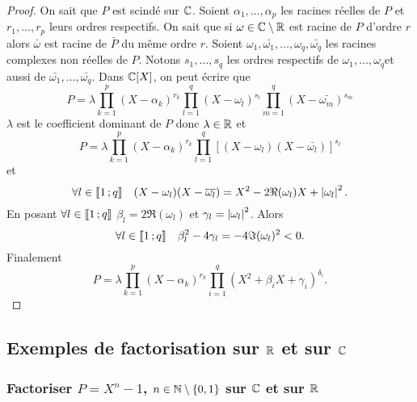   \begin{proof}
    On sait que \(P\) est scindé sur \(\mathbb{C}\). Soient \(\alpha_1, \ldots, \alpha_p\) les racines réelles de \(P\) et \(r_1, \ldots, r_p\) leurs ordres respectifs. On sait que si \(\omega \in \mathbb{C}\setminus\mathbb{R}\) est racine de \(P\) d'ordre \(r\) alors \(\bar{\omega}\) est racine de \(\bar{P}\) du même ordre \(r\).
    Soient \(\omega_1, \bar{\omega_1}, \ldots, \omega_q, \bar{\omega_q}\) les racines complexes non réelles de \(P\). 
    Notons \(s_1, \ldots, s_q\) les ordres respectifs de \(\omega_1, \ldots, \omega_q\)et aussi de \(\bar{\omega_1}, \ldots, \bar{\omega_q}\). Dans \(\mathbb{C}[X]\), on peut écrire que
    \begin{equation}
      P=\lambda \prod_{k=1}^p (X-\alpha_k)^{r_k} \prod_{l=1}^q (X-\omega_l)^{s_l} \prod_{m=1}^q (X-\bar{\omega_m})^{s_m}
    \end{equation}
    \(\lambda\) est le coefficient dominant de \(P\) donc \(\lambda \in \mathbb{R}\) et
    \begin{equation}
      P = \lambda \prod_{k=1}^p (X-\alpha_k)^{r_k} \prod_{l=1}^q [(X-\omega_l)(X-\bar{\omega_l})]^{s_l}
    \end{equation}
    et 
    \begin{equation}
      \forall l \in \mathopen{\llbracket}1\mathclose{}\mathpunct{};q\mathclose{\rrbracket} \quad (X-\omega_l)(X-\overline{\omega_l}) = X^2 -2\Re(\omega_l)X + \left\lvert\omega_l\right\rvert^2.
    \end{equation}
    En posant \(\forall l \in \mathopen{\llbracket}1\mathclose{}\mathpunct{};q\mathclose{\rrbracket}\) \(\beta_l = 2\Re(\omega_l)\) et \(\gamma_l = \left\lvert\omega_l\right\rvert^2\). Alors
    \begin{equation}
      \forall l \in \mathopen{\llbracket}1\mathclose{}\mathpunct{};q\mathclose{\rrbracket} \quad \beta_l^2 -4\gamma_l = -4\Im(\omega_l)^2 < 0.
    \end{equation}
    Finalement
    \begin{equation}
      P = \lambda \prod_{k=1}^p (X-\alpha_k)^{r_k} \prod_{i=1}^q(X^2+\beta_i X+\gamma_i)^{\delta_i}.
    \end{equation}
  \end{proof}

  \subsection{Exemples de factorisation sur \(\mathbb{R}\) et sur \(\mathbb{C}\)}

  \subsubsection{Factoriser \(P=X^n-1\), \(n \in \mathbb{N}\setminus\{0,1\}\) sur \(\mathbb{C}\) et sur \(\mathbb{R}\)}

